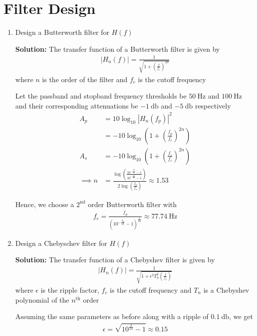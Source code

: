 \documentclass[journal,12pt,twocolumn]{IEEEtran}
\newcommand{\solution}{\noindent \textbf{Solution: }}
\providecommand{\brak}[1]{\ensuremath{\left(#1\right)}}
\providecommand{\abs}[1]{\left\vert#1\right\vert}
\numberwithin{equation}{section}
\numberwithin{figure}{section}
\renewcommand\thesection{\arabic{section}}
\begin{document}
	\section{Filter Design}
	\begin{enumerate}[label=\thesection.\arabic*,ref=\thesection.\theenumi]
	\item Design a Butterworth filter for $H(f)$
	
	\solution The transfer function of a Butterworth filter is given by
	\begin{align}
		\abs{H_n(f)} = \frac{1}{\sqrt{1+\brak{\frac{f}{f_c}}^{2n}}}
	\end{align}
	where $n$ is the order of the filter and $f_c$ is the cutoff frequency
	
	Let the passband and stopband frequency thresholds be $\SI{50}{\hertz}$ and $\SI{100}{\hertz}$ and their corresponding attenuations be $-\SI{1}{\decibel}$ and $-\SI{5}{\decibel}$ respectively
	\begin{align}
		A_p &= 10 \log_{10}\abs{H_n(f_p)}^2 \\
		&= -10\log_{10}\brak{1+\brak{\frac{f_p}{f_c}}^{2n}} \\
		A_s &= -10\log_{10}\brak{1+\brak{\frac{f_s}{f_c}}^{2n}} \\
		\implies n &=\frac{\log\brak{\frac{10^{-\frac{A_p}{10}}-1}{ 10^{-\frac{A_s}{10}}-1}}}{2 \log \brak{\frac{f_p}{f_s}}} \approx 1.53
	\end{align}
	
	Hence, we choose a $2^{\mathrm{nd}}$ order Butterworth filter with
	\begin{align}
		f_c = \frac{f_p}{\brak{10^{-\frac{A_p}{10}}-1}^{\frac{1}{2n}}} \approx \SI{77.74}{\hertz}
	\end{align}

	\item Design a Chebyschev filter for $H(f)$	
	
	\solution The transfer function of a Chebyshev filter is given by
	\begin{align}
		\abs{H_n(f)} =\frac{1}{\sqrt{1+\epsilon^{2}T_{n}^2\brak{\frac{f}{f_c}}}}
	\end{align}
	where $\epsilon$ is the ripple factor, $f_c$ is the cutoff frequency and $T_n$ is a Chebyshev polynomial of the $n^{\mathrm{th}}$ order
	
	Assuming the same parameters as before along with a ripple of $\SI{0.1}{\decibel}$, we get
	\begin{align}
		\epsilon = \sqrt{10^{\frac{\delta}{10}} - 1} \approx 0.15
	\end{align}
	

\end{enumerate}
\end{document}
